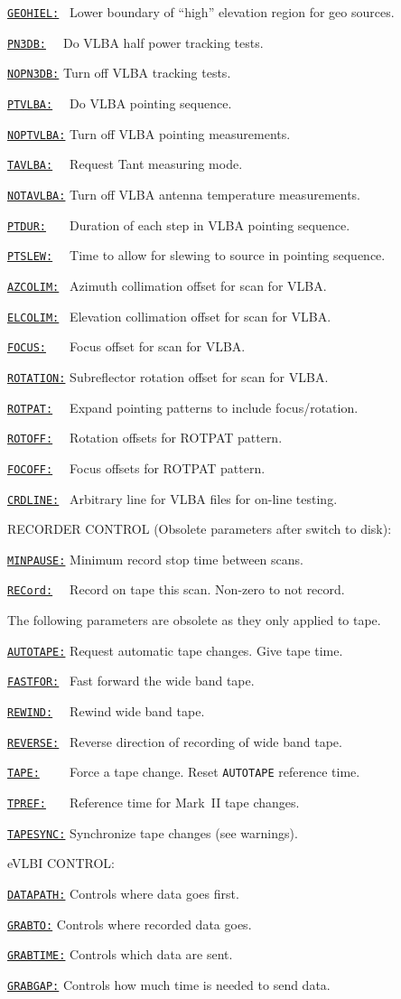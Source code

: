 \documentclass{report}
\newcommand{\htlm}[2]%
{\item
  \hyperref[MP:#1]{{\tt #1:}}{\tt #2}%
}
\newcommand{\htln}[3]%
{\item
  \hyperref[MP:#2]{{\tt #1:}}{\tt #3}%
}
\begin{document}
\begin{list}{}{\parsep 0em  \itemsep 0em }
\htlm{GEOHIEL}{~} Lower boundary of ``high'' elevation region for geo sources.
\htlm{PN3DB}{~~}  Do VLBA half power tracking tests.
\htln{NOPN3DB}{PTVLBA}{} Turn off VLBA tracking tests.
\htlm{PTVLBA}{~~} Do VLBA pointing sequence.
\htln{NOPTVLBA}{PTVLBA}{} Turn off VLBA pointing measurements.
\htlm{TAVLBA}{~~} Request Tant measuring mode.
\htln{NOTAVLBA}{TAVLBA}{} Turn off VLBA antenna temperature measurements.
\htlm{PTDUR}{~~~} Duration of each step in VLBA pointing
                        sequence.
\htlm{PTSLEW}{~~} Time to allow for slewing to source in
                        pointing sequence.
\htlm{AZCOLIM}{~} Azimuth collimation offset for scan for VLBA.
\htlm{ELCOLIM}{~} Elevation collimation offset for scan for VLBA.
\htlm{FOCUS}{~~~} Focus offset for scan for VLBA.
\htlm{ROTATION}{} Subreflector rotation offset for scan for VLBA.
\htlm{ROTPAT}{~~} Expand pointing patterns to include focus/rotation.
\htlm{ROTOFF}{~~} Rotation offsets for ROTPAT pattern.
\htlm{FOCOFF}{~~} Focus offsets for ROTPAT pattern.
\htlm{CRDLINE}{~} Arbitrary line for VLBA files for on-line testing.
\end{list}

RECORDER CONTROL (Obsolete parameters after switch to disk):

\begin{list}{}{\parsep 0em  \itemsep 0em }
\htlm{MINPAUSE}{} Minimum record stop time between scans.
\htln{RECord}{RECORD}{~~} Record on tape this scan. Non-zero to not record.
\end{list}

The following parameters are obsolete as they only applied to tape.

\begin{list}{}{\parsep 0em  \itemsep 0em }
\htlm{AUTOTAPE}{} Request automatic tape changes. Give tape time.
\htlm{FASTFOR}{~} Fast forward the wide band tape.
\htlm{REWIND}{~~} Rewind wide band tape.
\htlm{REVERSE}{~} Reverse direction of recording of wide band tape.
\htlm{TAPE}{~~~~} Force a tape change. Reset {\tt AUTOTAPE}
                        reference time.
\htlm{TPREF}{~~~} Reference time for Mark~II tape changes.
\htlm{TAPESYNC}{} Synchronize tape changes (see warnings).
\end{list}

eVLBI CONTROL:

\begin{list}{}{\parsep 0em  \itemsep 0em }
\htlm{DATAPATH}{} Controls where data goes first.
\htlm{GRABTO}{} Controls where recorded data goes.
\htlm{GRABTIME}{} Controls which data are sent.
\htlm{GRABGAP}{} Controls how much time is needed to send data.
\end{list}
\end{document}
